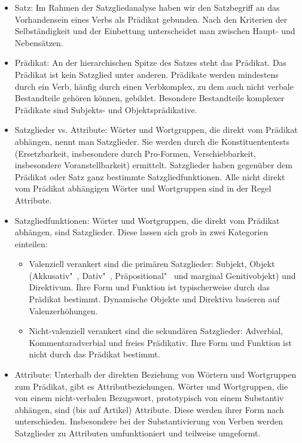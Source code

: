 \begin{itemize}

\item Satz: Im Rahmen der Satzgliedanalyse haben wir den Satzbegriff an das Vorhandensein eines Verbs als Prädikat gebunden. Nach den Kriterien der Selbständigkeit und der Einbettung unterscheidet man zwischen Haupt- und Nebensätzen. 

\item Prädikat: An der hierarchischen Spitze des Satzes steht das Prädikat. Das Prädikat ist kein Satzglied unter anderen. Prädikate werden mindestens durch ein Verb, häufig durch einen Verbkomplex, zu dem auch nicht verbale Bestandteile gehören können, gebildet. Besondere Bestandteile komplexer Prädikate sind Subjekts- und Objektsprädikative. 
  
\item Satzglieder vs. Attribute: Wörter und Wortgruppen, die direkt vom Prädikat abhängen, nennt man Satzglieder. Sie werden durch die Konstituententests (Ersetzbarkeit, insbesondere durch Pro-Formen, Verschiebbarkeit, insbesondere Voranstellbarkeit) ermittelt. Satzglieder haben gegenüber dem Prädikat oder Satz ganz bestimmte Satzgliedfunktionen. Alle nicht direkt vom Prädikat abhängigen Wörter und Wortgruppen sind in der Regel Attribute.

\item Satzgliedfunktionen: Wörter und Wortgruppen, die direkt vom Prädikat abhängen, sind Satzglieder. Diese lassen sich grob in zwei Kategorien einteilen:

\begin{itemize}  
\item Valenziell verankert sind die primären Satzglieder: Subjekt, Objekt (Akkusativ"~, Dativ"~, Präpositional"~ und marginal Genitivobjekt) und Direktivum. Ihre Form und Funktion ist typischerweise durch das Prädikat bestimmt. Dynamische Objekte und Direktiva basieren auf Valenzerhöhungen.

\item Nicht-valenziell verankert sind die sekundären Satzglieder: Adverbial, Kommentaradverbial und freies Prädikativ. Ihre Form und Funktion ist nicht durch das Prädikat bestimmt.

\end{itemize}

\item Attribute: Unterhalb der direkten Beziehung von Wörtern und Wortgruppen zum Prädikat, gibt es Attributbeziehungen. Wörter und Wortgruppen, die von einem nicht-verbalen Bezugswort, prototypisch von einem Substantiv abhängen, sind (bis auf Artikel) Attribute. Diese werden ihrer Form nach unterschieden. Insbesondere bei der Substantivierung von Verben werden Satzglieder zu Attributen umfunktioniert und teilweise umgeformt.


\end{itemize}
